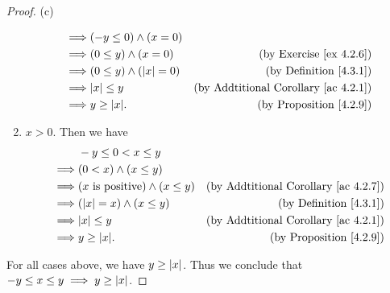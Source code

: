 \begin{proof}{(c)}
\begin{enumerate}[label=(\Roman*)]
\begin{align*}
                  \implies & (-y \leq 0) \land (x = 0)                                                          \\
                  \implies & (0 \leq y) \land (x = 0)        & \text{(by Exercise \ref{ex 4.2.6})}              \\
                  \implies & (0 \leq y) \land (\abs*{x} = 0) & \text{(by Definition \ref{4.3.1})}               \\
                  \implies & \abs*{x} \leq y                 & \text{(by Addtitional Corollary \ref{ac 4.2.1})} \\
                  \implies & y \geq \abs*{x}.                & \text{(by Proposition \ref{4.2.9})}
              \end{align*}
        \item \(x > 0\).
              Then we have
              \begin{align*}
                           & -y \leq 0 < x \leq y                                                                        \\
                  \implies & (0 < x) \land (x \leq y)                                                                    \\
                  \implies & (x \text{ is positive}) \land (x \leq y) & \text{(by Addtitional Corollary \ref{ac 4.2.7})} \\
                  \implies & (\abs*{x} = x) \land (x \leq y)          & \text{(by Definition \ref{4.3.1})}               \\
                  \implies & \abs*{x} \leq y                          & \text{(by Addtitional Corollary \ref{ac 4.2.1})} \\
                  \implies & y \geq \abs*{x}.                         & \text{(by Proposition \ref{4.2.9})}
              \end{align*}
    \end{enumerate}
    For all cases above, we have \(y \geq \abs*{x}\).
    Thus we conclude that \(-y \leq x \leq y \implies y \geq \abs*{x}\).


\end{proof}
